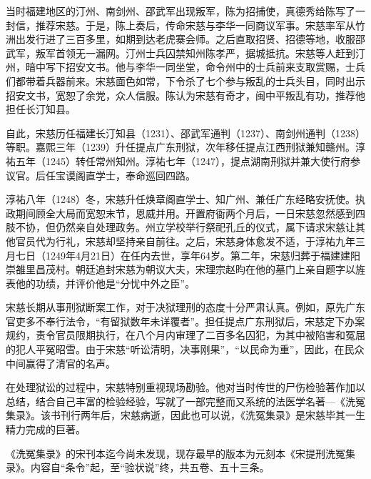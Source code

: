 \documentclass[12pt,UTF8]{ctexbook}
\begin{document}
当时福建地区的汀州、南剑州、邵武军出现叛军，陈为招捕使，真德秀给陈写了一封信，推荐宋慈。于是，陈上奏后，传命宋慈与李华一同商议军事。宋慈率军从竹洲出发行进了三百多里，如期到达老虎寨会师。之后直取招贤、招德等地，收服邵武军，叛军首领无一漏网。汀州士兵囚禁知州陈孝严，据城抵抗。宋慈等人赶到汀州，暗中写下招安文书。他与李华一同坐堂，命令州中的士兵前来支取赏赐，士兵们都带着兵器前来。宋慈面色如常，下令杀了七个参与叛乱的士兵头目，同时出示招安文书，宽恕了余党，众人信服。陈认为宋慈有奇才，闽中平叛乱有功，推荐他担任长汀知县。

自此，宋慈历任福建长汀知县（1231）、邵武军通判（1237）、南剑州通判（1238）等职。嘉熙三年（1239）升任提点广东刑狱，次年移任提点江西刑狱兼知赣州。淳祐五年（1245）转任常州知州。淳祐七年（1247），提点湖南刑狱并兼大使行府参议官。后任宝谟阁直学士，奉命巡回四路。

淳祐八年（1248）冬，宋慈升任焕章阁直学士、知广州、兼任广东经略安抚使。执政期间顾全大局而宽恕末节，恩威并用。开置府衙两个月后，一日宋慈忽然感到四肢不协，但仍然亲自处理政务。州立学校举行祭祀孔丘的仪式，属下请求宋慈让其他官员代为行礼，宋慈却坚持亲自前往。之后，宋慈身体愈发不适，于淳祐九年三月七日（1249年4月21日）在任内去世，享年64岁。第二年，宋慈归葬于福建建阳崇雒里昌茂村。朝廷追封宋慈为朝议大夫，宋理宗赵昀在他的墓门上亲自题字以旌表他的功绩，并评价他是“分忧中外之臣”。

宋慈长期从事刑狱断案工作，对于决狱理刑的态度十分严肃认真。例如，原先广东官吏多不奉行法令，“有留狱数年未详覆者”。担任提点广东刑狱后，宋慈定下办案规约，责令官员限期执行，在八个月内审理了二百多名囚犯，为其中被陷害和冤屈的犯人平冤昭雪。由于宋慈“听讼清明，决事刚果”，“以民命为重”，因此，在民众中间赢得了清官的名声。

在处理狱讼的过程中，宋慈特别重视现场勘验。他对当时传世的尸伤检验著作加以总结，结合自己丰富的检验经验，写就了一部完整而又系统的法医学名著—《洗冤集录》。该书刊行两年后，宋慈病逝，因此也可以说，《洗冤集录》是宋慈毕其一生精力完成的巨著。

《洗冤集录》的宋刊本迄今尚未发现，现存最早的版本为元刻本《宋提刑洗冤集录》。内容自“条令”起，至“验状说”终，共五卷、五十三条。
\end{document}

